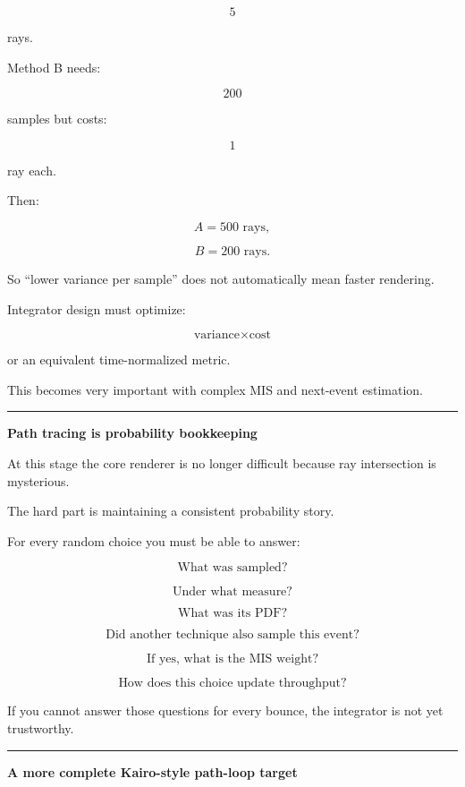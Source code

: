 \[
5
\]

rays.

Method B needs:

\[
200
\]

samples but costs:

\[
1
\]

ray each.

Then:

\[
A=500\text{ rays},
\]

\[
B=200\text{ rays}.
\]

So ``lower variance per sample'' does not automatically mean faster rendering.

Integrator design must optimize:

\[
\boxed{
\text{variance}\times\text{cost}
}
\]

or an equivalent time-normalized metric.

This becomes very important with complex MIS and next-event estimation.

\begin{center}\rule{0.5\linewidth}{0.5pt}\end{center}

\textbf{Path tracing is probability bookkeeping}

At this stage the core renderer is no longer difficult because ray intersection is mysterious.

The hard part is maintaining a consistent probability story.

For every random choice you must be able to answer:

\[
\text{What was sampled?}
\]

\[
\text{Under what measure?}
\]

\[
\text{What was its PDF?}
\]

\[
\text{Did another technique also sample this event?}
\]

\[
\text{If yes, what is the MIS weight?}
\]

\[
\text{How does this choice update throughput?}
\]

If you cannot answer those questions for every bounce, the integrator is not yet trustworthy.

\begin{center}\rule{0.5\linewidth}{0.5pt}\end{center}

\textbf{A more complete Kairo-style path-loop target}

